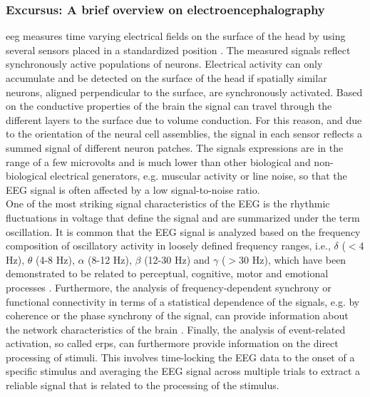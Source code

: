 \begin{tcolorbox}
    \subsubsection{Excursus: A brief overview on electroencephalography}
    \Gls{eeg} measures time varying electrical fields on the surface of the head by using several sensors placed in a standardized position \cite{Jackson2014}. The measured signals reflect synchronously active populations of neurons. Electrical activity can only accumulate and be detected on the surface of the head if spatially similar neurons, aligned perpendicular to the surface, are synchronously activated. Based on the conductive properties of the brain the signal can travel through the different layers to the surface due to volume conduction. For this reason, and due to the orientation of the neural cell assemblies, the signal in each sensor reflects a summed signal of different neuron patches. The signals expressions are in the range of a few microvolts and is much lower than other biological and non-biological electrical generators, e.g. muscular activity or line noise, so that the EEG signal is often affected by a low signal-to-noise ratio.\\
    One of the most striking signal characteristics of the EEG is the rhythmic fluctuations in voltage that define the signal and are summarized under the term oscillation. It is common that the EEG signal is analyzed based on the frequency composition of oscillatory activity in loosely defined frequency ranges, i.e., $\delta$ ($<$4 Hz), $\theta$ (4-8 Hz), $\alpha$ (8-12 Hz), $\beta$ (12-30 Hz) and $\gamma$ ($>$30 Hz), which have been demonstrated to be related to perceptual, cognitive, motor and emotional processes \cite{CohenX2017}. Furthermore, the analysis of frequency-dependent synchrony or functional connectivity in terms of a statistical dependence of the signals, e.g. by coherence or the phase synchrony of the signal, can provide information about the network characteristics of the brain \cite{Siegel2012}. Finally, the analysis of event-related activation, so called \glspl{erp}, can furthermore provide information on the direct processing of stimuli. This involves time-locking the EEG data to the onset of a specific stimulus and averaging the EEG signal across multiple trials to extract a reliable signal that is related to the processing of the stimulus.
\end{tcolorbox}

